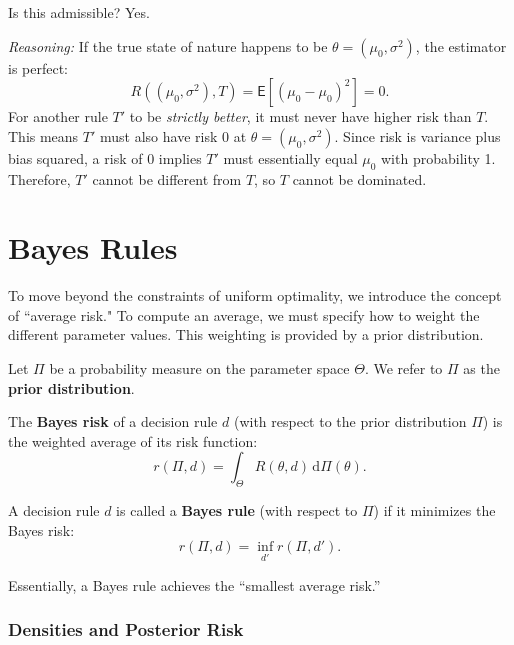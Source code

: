 \begin{ex}
\begin{enumerate}[label=\alph*)]
    Is this admissible? Yes.
    
    \textit{Reasoning:}
    If the true state of nature happens to be \(\theta = (\mu_0, \sigma^2)\), the estimator is perfect:
    \[
    R((\mu_0, \sigma^2), T) = \mathsf{E}[(\mu_0 - \mu_0)^2] = 0.
    \]
    For another rule \(T'\) to be \textit{strictly better}, it must never have higher risk than \(T\). This means \(T'\) must also have risk \(0\) at \(\theta = (\mu_0, \sigma^2)\). Since risk is variance plus bias squared, a risk of 0 implies \(T'\) must essentially equal \(\mu_0\) with probability 1. Therefore, \(T'\) cannot be different from \(T\), so \(T\) cannot be dominated.
\end{enumerate}
\end{ex}

\section{Bayes Rules}
\label{sec:bayes_rules}

To move beyond the constraints of uniform optimality, we introduce the concept of ``average risk." To compute an average, we must specify how to weight the different parameter values. This weighting is provided by a prior distribution.

Let \(\Pi\) be a probability measure on the parameter space \(\Theta\). We refer to \(\Pi\) as the \textbf{prior distribution}.

\begin{definition}
\label{def:bayes_risk}
The \textbf{Bayes risk} of a decision rule \(d\) (with respect to the prior distribution \(\Pi\)) is the weighted average of its risk function:
\[
r(\Pi, d) = \int_{\Theta} R(\theta, d) \, \mathrm{d}\Pi(\theta).
\]
\end{definition}

\begin{definition}
\label{def:bayes_rule}
A decision rule \(d\) is called a \textbf{Bayes rule} (with respect to \(\Pi\)) if it minimizes the Bayes risk:
\[
r(\Pi, d) = \inf_{d'} r(\Pi, d').
\]
\end{definition}
Essentially, a Bayes rule achieves the ``smallest average risk.''



\subsubsection{Densities and Posterior Risk}
\label{subsec:densities_posterior}

